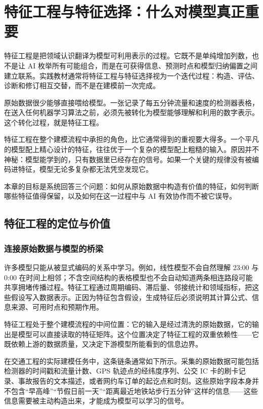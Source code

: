 ﻿\chapter{特征工程与特征选择：什么对模型真正重要}

特征工程是把领域认识翻译为模型可利用表示的过程。它既不是单纯增加列数，也不是让 AI 枚举所有可能组合，而是在可获得信息、预测时点和模型归纳偏置之间建立联系。实践教材通常将特征工程与特征选择视为一个迭代过程：构造、评估、诊断和修订相互交替，而不是在建模前一次完成\cite{kuhn2019feature}。

原始数据很少能够直接喂给模型。一张记录了每五分钟流量和速度的检测器表格，在送入任何机器学习算法之前，必须先被转化为模型能够理解和利用的数字表示。这个转化过程，就是特征工程。

特征工程在整个建模流程中承担的角色，比它通常得到的重视要大得多。一个平凡的模型配上精心设计的特征，往往优于一个复杂的模型配上粗糙的输入。原因并不神秘：模型能学到的，只有数据里已经存在的信号。如果一个关键的规律没有被编码进特征，模型无论多复杂都无法凭空发现它。

本章的目标是系统回答三个问题：如何从原始数据中构造有价值的特征，如何判断哪些特征值得保留，以及如何在这一过程中与 AI 有效协作而不被它误导。


\section{特征工程的定位与价值}

\subsection{连接原始数据与模型的桥梁}

许多模型只能从被显式编码的关系中学习。例如，线性模型不会自然理解 23:00 与 0:00 在时间上相邻；不含空间结构的表格模型也不会自动知道两条相连路段可能共享拥堵传播过程。特征工程通过周期编码、滞后量、邻接统计和领域指标，把这些假设写入数据表示。正因为特征包含假设，生成特征后必须说明其计算公式、信息来源、可用时点和预期作用。

特征工程处于整个建模流程的中间位置：它的输入是经过清洗的原始数据，它的输出是模型可以直接读取的特征矩阵。这个位置决定了特征工程的双重依赖性——它既依赖上游的数据质量，又决定下游模型所能看到的信息边界。

在交通工程的实际建模任务中，这条链条通常如下所示。采集的原始数据可能包括检测器的时间戳和流量计数、GPS 轨迹点的经纬度序列、公交 IC 卡的刷卡记录、事故报告的文本描述，或者网约车订单的起讫点和时刻。这些原始字段本身并不包含“早高峰”“节假日前一天”“距离最近地铁站步行五分钟”这样的信息——这些信息需要被主动构造出来，才能成为模型可以学习的信号。

